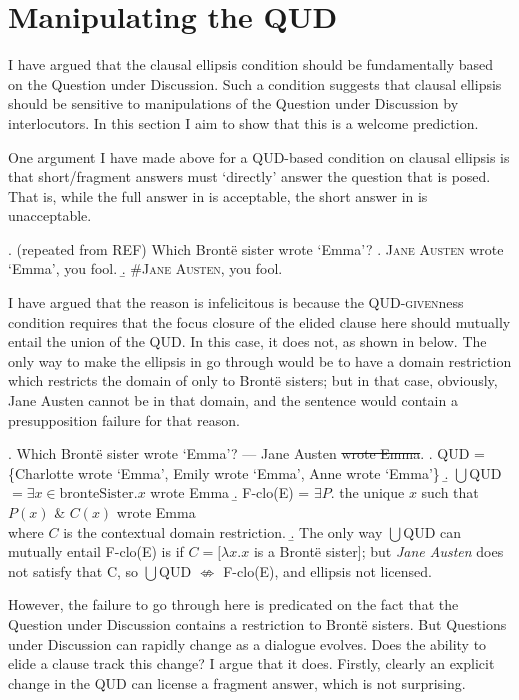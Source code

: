 \documentclass[11pt,letterpaper]{article}
\title{}
\author{Andrew Weir}
\newcommand{\pred}[1]{\ensuremath{\mathrm{{#1}}}}
\begin{document}
\section{Manipulating the QUD}

I have argued that the clausal ellipsis condition should be fundamentally based on the Question under Discussion. Such a condition suggests that clausal ellipsis should be sensitive to manipulations of the Question under Discussion by interlocutors.
In this section I aim to show that this is a welcome prediction.

One argument I have made above for a QUD-based condition on clausal ellipsis is that short/fragment answers must `directly' answer the question that is posed.
That is, while the full answer in \Next[a] is acceptable, the short answer in \Next[b] is unacceptable.

\ex. 	(repeated from REF) %
	Which Bront\"e sister wrote `Emma'?
	\a. \textsc{Jane Austen} wrote `Emma', you fool.
	\b. \#\textsc{Jane Austen}, you fool.
	
I have argued that the reason \Last[b] is infelicitous is because the \textsc{QUD-given}ness condition requires that the focus closure of the elided clause here should mutually entail the union of the QUD.
In this case, it does not, as shown in \Next below.
The only way to make the ellipsis in \Last[b] go through would be to have a domain restriction which restricts the domain of \Last[b] only to Bront\"e sisters; but in that case, obviously, Jane Austen cannot be in that domain, and the sentence would contain a presupposition failure for that reason.

\ex. 	Which Bront\"e sister wrote `Emma'? --- Jane Austen \sout{wrote Emma}.
	\a. QUD = \{Charlotte wrote `Emma', Emily wrote `Emma', Anne wrote `Emma'\}
	\b. $\bigcup$QUD $= \exists x \in \pred{bronteSister}. x$ wrote Emma
	\b. F-clo(E) = $\exists P. $ the unique $x$ such that $P(x) $ \& $C(x)$ wrote Emma\\
	where $C$ is the contextual domain restriction.
	\b. The only way $\bigcup$QUD can mutually entail F-clo(E) is if $C = [\lambda x. x$ is a Bront\"e sister]; but {\it Jane Austen} does not satisfy that C, so $\bigcup$QUD $\not \Leftrightarrow$ F-clo(E), and ellipsis not licensed.
	
However, the failure to go through here is predicated on the fact that the Question under Discussion contains a restriction to Bront\"e sisters.
But Questions under Discussion can rapidly change as a dialogue evolves.
Does the ability to elide a clause track this change?
I argue that it does.
Firstly, clearly an explicit change in the QUD can license a fragment answer, which is not surprising.
\end{document}
